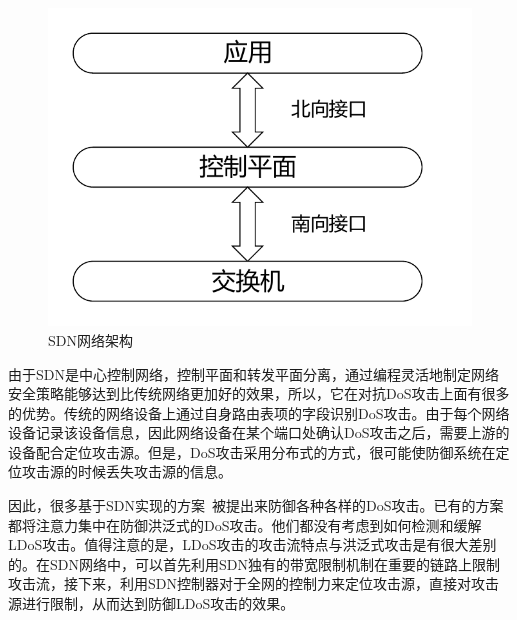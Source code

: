 \begin{figure}
    \centering
    \includegraphics[scale=0.7]{figures/SDN-network}
    \caption{SDN网络架构}
    \label{fig:sdnfig}
\end{figure}

由于SDN是中心控制网络，控制平面和转发平面分离，通过编程灵活地制定网络安全策略能够达到比传统网络更加好的效果，所以，它在对抗DoS攻击上面有很多的优势。传统的网络设备上通过自身路由表项的字段识别DoS攻击。由于每个网络设备记录该设备信息，因此网络设备在某个端口处确认DoS攻击之后，需要上游的设备配合定位攻击源。但是，DoS攻击采用分布式的方式，很可能使防御系统在定位攻击源的时候丢失攻击源的信息。

因此，很多基于SDN实现的方案~\cite{b9, b16, b11, b23, b24}被提出来防御各种各样的DoS攻击。已有的方案都将注意力集中在防御洪泛式的DoS攻击。他们都没有考虑到如何检测和缓解LDoS攻击。值得注意的是，LDoS攻击的攻击流特点与洪泛式攻击是有很大差别的。在SDN网络中，可以首先利用SDN独有的带宽限制机制在重要的链路上限制攻击流，接下来，利用SDN控制器对于全网的控制力来定位攻击源，直接对攻击源进行限制，从而达到防御LDoS攻击的效果。


